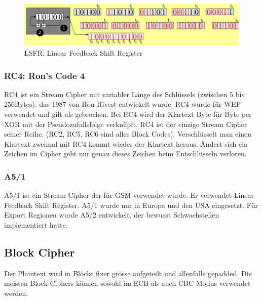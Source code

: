 \begin{figure}[h]
\centering
\includegraphics[width=0.7\linewidth]{images/lfsr}
\caption{LSFR: Linear Feedback Shift Register}
\end{figure}

\subsubsection{RC4: Ron's Code 4}
RC4 ist ein Stream Cipher mit variabler Länge des Schlüssels (zwischen 5 bis 256Bytes), das 1987 von Ron Rivest entwickelt wurde. RC4 wurde für WEP verwendet und gilt als gebrochen. Bei RC4 wird der Klartext Byte für Byte per XOR mit der Pseudozufallsfolge verknüpft. RC4 ist der einzige Stream Cipher seiner Reihe. (RC2, RC5, RC6 sind alles Block Codes). Verschlüsselt man einen Klartext zweimal mit RC4 kommt wieder der Klartext heraus. Ändert sich ein Zeichen im Cipher geht nur genau dieses Zeichen beim Entschlüsseln verloren.

\subsubsection{A5/1}
A5/1 ist ein Stream Cipher der für GSM verwendet wurde. Er verwendet Linear Feedback Shift Register. A5/1 wurde nur in Europa und den USA eingesetzt. Für Export Regionen wurde A5/2 entwickelt, der bewusst Schwachstellen implementiert hatte.

\subsection{Block Cipher}
Der Plaintext wird in Blöcke fixer grösse aufgeteilt und allenfalls gepadded. Die meisten Block Ciphers können 
sowohl im ECB als auch CBC Modus verwendet werden. 

